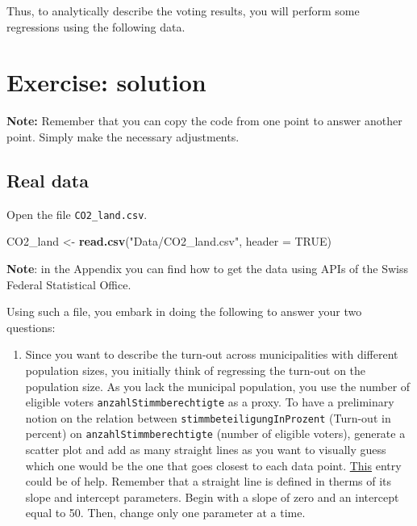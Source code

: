 \documentclass[
]{book}
\newenvironment{Shaded}{\begin{snugshade}}{\end{snugshade}}
\newcommand{\AttributeTok}[1]{\textcolor[rgb]{0.13,0.29,0.53}{#1}}
\newcommand{\ConstantTok}[1]{\textcolor[rgb]{0.56,0.35,0.01}{#1}}
\newcommand{\FunctionTok}[1]{\textcolor[rgb]{0.13,0.29,0.53}{\textbf{#1}}}
\newcommand{\NormalTok}[1]{#1}
\newcommand{\OtherTok}[1]{\textcolor[rgb]{0.56,0.35,0.01}{#1}}
\newcommand{\StringTok}[1]{\textcolor[rgb]{0.31,0.60,0.02}{#1}}
\providecommand{\tightlist}{%
  \setlength{\itemsep}{0pt}\setlength{\parskip}{0pt}}
\begin{document}
Thus, to analytically describe the voting results, you will perform some regressions using the following data.

\hypertarget{exercise-solution}{%
\section{Exercise: solution}\label{exercise-solution}}

\textbf{Note:} Remember that you can copy the code from one point to answer another point. Simply make the necessary adjustments.

\hypertarget{real-data}{%
\subsection{Real data}\label{real-data}}

Open the file \texttt{CO2\_land.csv}.

\begin{Shaded}
\begin{Highlighting}[]
\NormalTok{CO2\_land }\OtherTok{\textless{}{-}} \FunctionTok{read.csv}\NormalTok{(}\StringTok{"Data/CO2\_land.csv"}\NormalTok{, }\AttributeTok{header =} \ConstantTok{TRUE}\NormalTok{)}
\end{Highlighting}
\end{Shaded}

\textbf{Note}: in the Appendix you can find how to get the data using APIs of the Swiss Federal Statistical Office.

Using such a file, you embark in doing the following to answer your two questions:

\begin{enumerate}
\def\labelenumi{\roman{enumi}.}
\tightlist
\item
  Since you want to describe the turn-out across municipalities with different population sizes, you initially think of regressing the turn-out on the population size. As you lack the municipal population, you use the number of eligible voters \texttt{anzahlStimmberechtigte} as a proxy. To have a preliminary notion on the relation between \texttt{stimmbeteiligungInProzent} (Turn-out in percent) on \texttt{anzahlStimmberechtigte} (number of eligible voters), generate a scatter plot and add as many straight lines as you want to visually guess which one would be the one that goes closest to each data point. \href{https://ggplot2.tidyverse.org/reference/geom_abline.html}{This} entry could be of help. Remember that a straight line is defined in therms of its slope and intercept parameters. Begin with a slope of zero and an intercept equal to 50. Then, change only one parameter at a time.
\end{enumerate}
\end{document}
